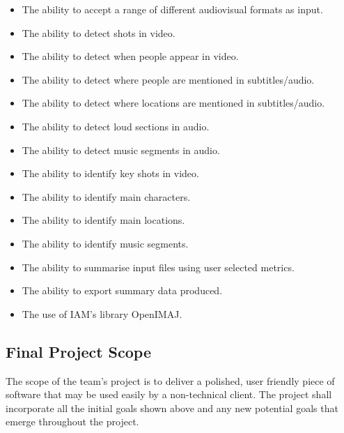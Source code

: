 \begin{itemize}
	\item{The ability to accept a range of different audiovisual formats as input.}
	\item{The ability to detect shots in video.}
	\item{The ability to detect when people appear in video.}
	\item{The ability to detect where people are mentioned in subtitles/audio.}
	\item{The ability to detect where locations are mentioned in subtitles/audio.}
	\item{The ability to detect loud sections in audio.}
	\item{The ability to detect music segments in audio.}
	\item{The ability to identify key shots in video.}
	\item{The ability to identify main characters.}
	\item{The ability to identify main locations.}
	\item{The ability to identify music segments.}
	\item{The ability to summarise input files using user selected metrics.}
	\item{The ability to export summary data produced.}
	\item{The use of IAM's library OpenIMAJ.}
\end{itemize}
		
\subsection{Final Project Scope}

The scope of the team's project is to deliver a polished, user friendly piece of
software that may be used easily by a non-technical client. The project
shall incorporate all the initial goals shown above and any new potential goals that emerge throughout the project. 

